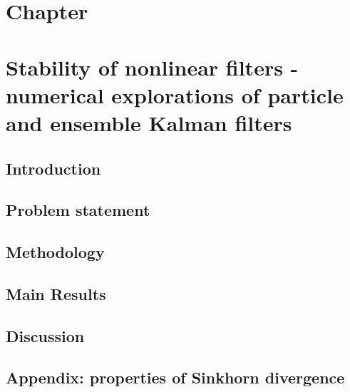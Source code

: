 \chapter*{Chapter }
\textit{}
\newpage

\chapter{ 
Stability of nonlinear filters - numerical explorations of particle and ensemble Kalman filters
}
\section{Introduction} \label{sec-intro--numerical-fs}


\section{Problem statement} \label{sec-prob--numerical-fs}


\section{Methodology} \label{sec-method--numerical-fs}


\section{Main Results} \label{sec-res--numerical-fs}

\section{Discussion} \label{sec-disc--numerical-fs}



\section{Appendix: properties of Sinkhorn divergence} \label{sec-app--numerical-fs}






